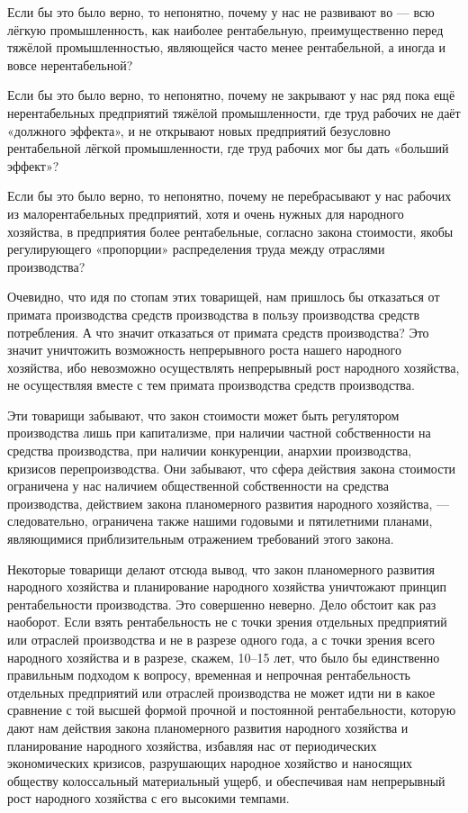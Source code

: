 \documentclass[12pt, a4paper, openany]{book}
\begin{document}
Если бы это было верно, то непонятно, почему у нас не развивают во — всю лёгкую промышленность, как наиболее рентабельную, преимущественно перед тяжёлой промышленностью, являющейся часто менее рентабельной, а иногда и вовсе нерентабельной?



Если бы это было верно, то непонятно, почему не закрывают у нас ряд пока ещё нерентабельных предприятий тяжёлой промышленности, где труд рабочих не даёт «должного эффекта», и не открывают новых предприятий безусловно рентабельной лёгкой промышленности, где труд рабочих мог бы дать «больший эффект»?



Если бы это было верно, то непонятно, почему не перебрасывают у нас рабочих из малорентабельных предприятий, хотя и очень нужных для народного хозяйства, в предприятия более рентабельные, согласно закона стоимости, якобы регулирующего «пропорции» распределения труда между отраслями производства?



Очевидно, что идя по стопам этих товарищей, нам пришлось бы отказаться от примата производства средств производства в пользу производства средств потребления. А что значит отказаться от примата средств производства? Это значит уничтожить возможность непрерывного роста нашего народного хозяйства, ибо невозможно осуществлять непрерывный рост народного хозяйства, не осуществляя вместе с тем примата производства средств производства.



Эти товарищи забывают, что закон стоимости может быть регулятором производства лишь при капитализме, при наличии частной собственности на средства производства, при наличии конкуренции, анархии производства, кризисов перепроизводства. Они забывают, что сфера действия закона стоимости ограничена у нас наличием общественной собственности на средства производства, действием закона планомерного развития народного хозяйства, — следовательно, ограничена также нашими годовыми и пятилетними планами, являющимися приблизительным отражением требований этого закона.



Некоторые товарищи делают отсюда вывод, что закон планомерного развития народного хозяйства и планирование народного хозяйства уничтожают принцип рентабельности производства. Это совершенно неверно. Дело обстоит как раз наоборот. Если взять рентабельность не с точки зрения отдельных предприятий или отраслей производства и не в разрезе одного года, а с точки зрения всего народного хозяйства и в разрезе, скажем, 10–15 лет, что было бы единственно правильным подходом к вопросу, временная и непрочная рентабельность отдельных предприятий или отраслей производства не может идти ни в какое сравнение с той высшей формой прочной и постоянной рентабельности, которую дают нам действия закона планомерного развития народного хозяйства и планирование народного хозяйства, избавляя нас от периодических экономических кризисов, разрушающих народное хозяйство и наносящих обществу колоссальный материальный ущерб, и обеспечивая нам непрерывный рост народного хозяйства с его высокими темпами.
\end{document}
